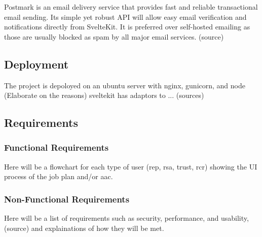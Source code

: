 Postmark is an email delivery service that provides fast and reliable transactional email sending. Its simple yet robust API will allow easy email verification and notifications directly from SvelteKit. It is preferred over self-hosted emailing as those are usually blocked as spam by all major email services. (source)

\subsection{Deployment}
The project is depoloyed on an ubuntu server with nginx, gunicorn, and node (Elaborate on the reasons) sveltekit has adaptors to ... (sources)

\subsection{Requirements}
\subsubsection{Functional Requirements}
Here will be a flowchart for each type of user (rep, rsa, trust, rcr) showing the UI process of the job plan and/or aac. 

\subsubsection{Non-Functional Requirements}
Here will be a list of requirements such as security, performance, and usability, (source) and explainations of how they will be met.
